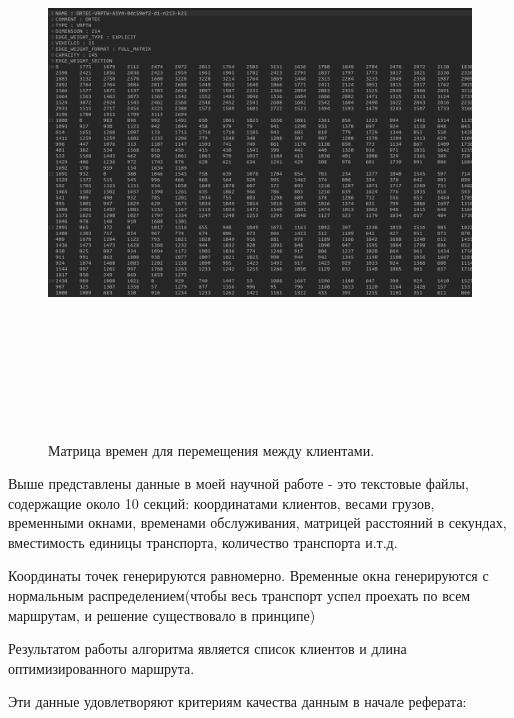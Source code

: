 \documentclass{article}
\begin{document}
\begin{figure}[H]
    \centering
    \includegraphics[width=16cm,height=15cm]{data1.png}
    \caption{Матрица времен для перемещения между клиентами.}
    \label{fig:my_label}
\end{figure}

Выше представлены данные в моей научной работе - это текстовые файлы, содержащие около 10 секций: координатами клиентов, весами грузов, временными окнами, временами обслуживания, матрицей расстояний в секундах, вместимость единицы транспорта, количество транспорта и.т.д.

Координаты точек генерируются равномерно. Временные окна генерируются с нормальным распределением(чтобы весь транспорт успел проехать по всем маршрутам, и решение существовало в принципе)

Результатом работы алгоритма является список клиентов и длина оптимизированного маршрута.

Эти данные удовлетворяют критериям качества данным в начале реферата:
\end{document}

